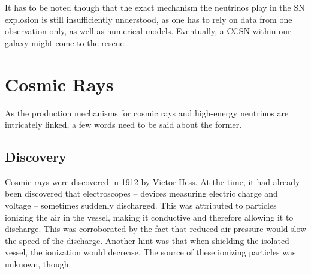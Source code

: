 \documentclass[
    a4paper, %
    fontsize=10pt, %
    twoside=false, %
    numbers=noenddot, %
    fontmethod=tex,
]{kaobook}
\begin{document}
It has to be noted though that the exact mechanism the neutrinos play in the SN explosion is still insufficiently understood, as one has to rely on data from one observation only, as well as numerical models. Eventually, a CCSN within our galaxy might come to the rescue .

\section{Cosmic Rays} \label{cosmic_rays}

As the production mechanisms for cosmic rays and high-energy neutrinos are intricately linked, a few words need to be said about the former.

\subsection{Discovery}

Cosmic rays were discovered in 1912 by Victor Hess. At the time, it had already been discovered that electroscopes -- devices measuring electric charge and voltage -- sometimes suddenly discharged. This was attributed to particles ionizing the air in the vessel, making it conductive and therefore allowing it to discharge. This was corroborated by the fact that reduced air pressure would slow the speed of the discharge. Another hint was that when shielding the isolated vessel, the ionization would decrease. The source of these ionizing particles was unknown, though.
\end{document}
